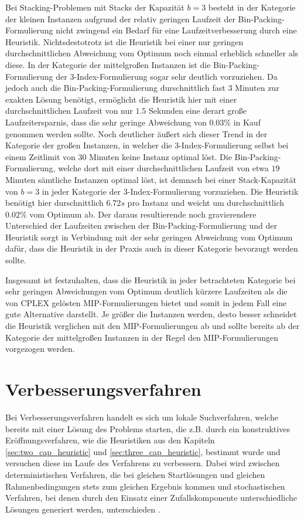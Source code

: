Bei Stacking-Problemen mit Stacks der Kapazität $b = 3$ besteht in der Kategorie der kleinen Instanzen
aufgrund der relativ geringen Laufzeit der Bin-Packing-Formulierung nicht zwingend ein Bedarf für eine
Laufzeitverbesserung durch eine Heuristik. Nichtsdestotrotz ist die Heuristik bei einer nur geringen
durchschnittlichen Abweichung vom Optimum noch einmal erheblich schneller als diese.
In der Kategorie der mittelgroßen Instanzen ist die Bin-Packing-Formulierung der 3-Index-Formulierung sogar
sehr deutlich vorzuziehen. Da jedoch auch die Bin-Packing-Formulierung durschnittlich fast $3$ Minuten zur exakten Lösung benötigt, ermöglicht die Heuristik hier mit einer durchschnittlichen Laufzeit von nur $1.5$ Sekunden eine derart große Laufzeitersparnis, dass die sehr geringe Abweichung von $0.03 \%$ in Kauf genommen werden sollte.
Noch deutlicher äußert sich dieser Trend in der Kategorie der großen Instanzen, in welcher die 3-Index-Formulierung
selbst bei einem Zeitlimit von $30$ Minuten keine Instanz optimal löst. Die Bin-Packing-Formulierung, welche dort
mit einer durchschnittlichen Laufzeit von etwa $19$ Minuten sämtliche Instanzen optimal löst,
ist demnach bei einer Stack-Kapazität von $b = 3$ in jeder Kategorie der 3-Index-Formulierung vorzuziehen.
Die Heuristik benötigt hier durschnittlich $6.72s$ pro Instanz und weicht um durchschnittlich $0.02 \%$ vom Optimum ab.
Der daraus resultierende noch gravierendere Unterschied der Laufzeiten zwischen der Bin-Packing-Formulierung und
der Heuristik sorgt in Verbindung mit der sehr geringen Abweichung vom Optimum dafür, dass die Heuristik in der Praxis
auch in dieser Kategorie bevorzugt werden sollte.

Insgesamt ist festzuhalten, dass die Heuristik in jeder betrachteten Kategorie bei sehr geringen Abweichungen
vom Optimum deutlich kürzere Laufzeiten als die von \textsc{CPLEX} gelösten MIP-Formulierungen bietet und somit in
jedem Fall eine gute Alternative darstellt. Je größer die Instanzen werden, desto besser schneidet die Heuristik
verglichen mit den MIP-Formulierungen ab und sollte bereits ab der Kategorie der mittelgroßen Instanzen in der Regel
den MIP-Formulierungen vorgezogen werden.

\vfill
\pagebreak

\section{Verbesserungsverfahren}
\label{sec:post_optimization}

Bei Verbesserungsverfahren handelt es sich um lokale Suchverfahren, welche bereits mit einer Lösung des Problems starten, die z.B. durch ein konstruktives Eröffnungsverfahren, wie die Heuristiken aus den Kapiteln \ref{sec:two_cap_heuristic} und \ref{sec:three_cap_heuristic}, bestimmt wurde und versuchen diese im Laufe des Verfahrens zu verbessern. Dabei wird zwischen deterministischen Verfahren, die bei gleichen Startlösungen und gleichen Rahmenbedingungen stets zum gleichen Ergebnis kommen und stochastischen Verfahren, bei denen durch den Einsatz einer Zufallskomponente unterschiedliche Lösungen generiert werden, unterschieden \cite{Knust2017}.

